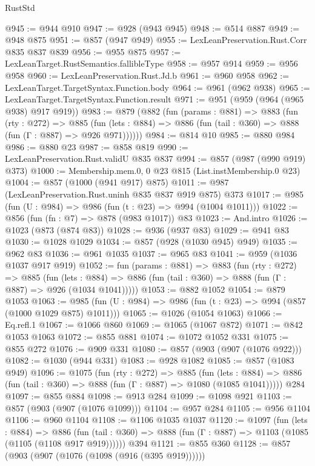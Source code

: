 \begin{lexlean}{RustStd}
\begin{coremodule}
{\begin{coremodule}
{{{{{{{{{@945 := @944 @910
@947 := @928 (@943 @945)
@948 := @514 @887
@949 := @948 @875
@951 := @857 (@947 @949)
@955 := LexLeanPreservation.Rust.Corr @835 @837 @839
@956 := @955 @875
@957 := LexLeanTarget.RustSemantics.fallibleType
@958 := @957 @914
@959 := @956 @958
@960 := LexLeanPreservation.Rust.Jd.b
@961 := @960 @958
@962 := LexLeanTarget.TargetSyntax.Function.body
@964 := @961 (@962 @938)
@965 := LexLeanTarget.TargetSyntax.Function.result
@971 := @951 (@959 (@964 (@965 @938) @917 @919))
@983 := @879
    (@882
      (fun (params : @881) =>
      @883
        (fun (rty : @272) =>
        @885
          (fun (lets : @884) => @886 (fun (tail : @360) => @888 (fun (Γ : @887) => @926 @971))))))
@984 := @814 @10
@985 := @880 @984
@986 := @880 @23
@987 := @858 @819
@990 := LexLeanPreservation.Rust.validU @835 @837
@994 := @857 (@987 (@990 @919) @373)
@1000 := Membership.mem.{0, 0} @23 @815 (List.instMembership.{0} @23)
@1004 := @857 (@1000 (@941 @917) @875)
@1011 := @987 (LexLeanPreservation.Rust.uninh @835 @837 @919 @875) @373
@1017 := @985 (fun (U : @984) => @986 (fun (t : @23) => @994 (@1004 @1011)))
@1022 := @856 (fun (fn : @7) => @878 (@983 @1017)) @83
@1023 := And.intro
@1026 := @1023 (@873 (@874 @83))
@1028 := @936 (@937 @83)
@1029 := @941 @83
@1030 := @1028 @1029
@1034 := @857 (@928 (@1030 @945) @949)
@1035 := @962 @83
@1036 := @961 @1035
@1037 := @965 @83
@1041 := @959 (@1036 @1037 @917 @919)
@1052 := fun (params : @881) =>
  @883
    (fun (rty : @272) =>
    @885
      (fun (lets : @884) =>
      @886 (fun (tail : @360) => @888 (fun (Γ : @887) => @926 (@1034 @1041)))))
@1053 := @882 @1052
@1054 := @879 @1053
@1063 := @985 (fun (U : @984) => @986 (fun (t : @23) => @994 (@857 (@1000 @1029 @875) @1011)))
@1065 := @1026 (@1054 @1063)
@1066 := Eq.refl.{1}
@1067 := @1066 @860
@1069 := @1065 (@1067 @872)
@1071 := @842 @1053 @1063
@1072 := @855 @881
@1074 := @1072 @1052 @331
@1075 := @855 @272
@1076 := @909 @331
@1080 := @857 (@903 (@907 (@1076 @922)))
@1082 := @1030 (@944 @331)
@1083 := @928 @1082
@1085 := @857 (@1083 @949)
@1096 := @1075
    (fun (rty : @272) =>
    @885
      (fun (lets : @884) =>
      @886 (fun (tail : @360) => @888 (fun (Γ : @887) => @1080 (@1085 @1041)))))
    @284
@1097 := @855 @884
@1098 := @913 @284
@1099 := @1098 @921
@1103 := @857 (@903 (@907 (@1076 @1099)))
@1104 := @957 @284
@1105 := @956 @1104
@1106 := @960 @1104
@1108 := @1106 @1035 @1037
@1120 := @1097
    (fun (lets : @884) =>
    @886 (fun (tail : @360) => @888 (fun (Γ : @887) => @1103 (@1085 (@1105 (@1108 @917 @919))))))
    @394
@1121 := @855 @360
@1128 := @857 (@903 (@907 (@1076 (@1098 (@916 (@395 @919))))))
}}}}}}}}}
\end{coremodule}}
\end{coremodule}
\end{lexlean}
